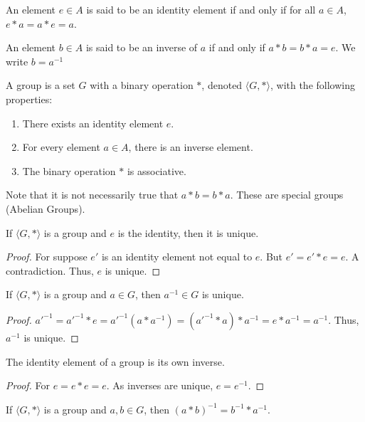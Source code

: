 \documentclass[crop=false,class=book]{standalone}
\begin{document}
\begin{definition}
An element $e\in A$ is said to be an identity element if and only if for all $a\in A$, $e*a = a*e = a$.
\end{definition}
\begin{definition}
An element $b\in A$ is said to be an inverse of $a$ if and only if $a*b=b*a = e$. We write $b=a^{-1}$
\end{definition}
\begin{definition}[Group]
A group is a set $G$ with a binary operation $*$, denoted $\langle G,* \rangle$, with the following properties: 
\begin{enumerate}
\item There exists an identity element $e$.
\item For every element $a\in A$, there is an inverse element.
\item The binary operation $*$ is associative.
\end{enumerate}
\end{definition}
\begin{remark}
Note that it is not necessarily true that $a*b = b*a$. These are special groups (Abelian Groups).
\end{remark}
\begin{theorem}
If $\langle G, * \rangle$ is a group and $e$ is the identity, then it is unique.
\end{theorem}
\begin{proof}
For suppose $e'$ is an identity element not equal to $e$. But $e' = e'*e  = e$. A contradiction. Thus, $e$ is unique.
\end{proof}
\begin{theorem}
If $\langle G, * \rangle$ is a group and $a\in G$, then $a^{-1}\in G$ is unique.
\end{theorem}
\begin{proof}
$a'^{-1} = a'^{-1}*e = a'^{-1}(a*a^{-1}) = (a'^{-1}*a)*a^{-1} = e*a^{-1} = a^{-1}$. Thus, $a^{-1}$ is unique.
\end{proof}
\begin{corollary}
The identity element of a group is its own inverse.
\end{corollary}
\begin{proof}
For $e=e*e = e$. As inverses are unique, $e=e^{-1}$.
\end{proof}
\begin{theorem}
If $\langle G,*\rangle$ is a group and $a,b\in G$, then $(a*b)^{-1} = b^{-1}*a^{-1}$.
\end{theorem}
\end{document}
